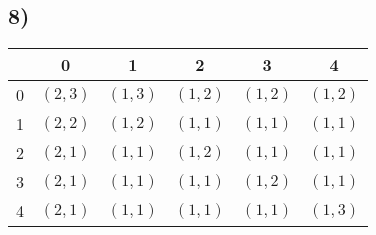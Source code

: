 \documentclass{report}
\begin{document}
\subsection*{8)}
\begin{center}
    \begin{tabularx}{200pt}{|X|c|c|c|c|c|}
        \hline
         & 0 & 1 & 2 & 3 & 4 \\\hline
         0 & $(2,3)$ & $(1,3)$ & $(1,2)$ & $(1,2)$ & $(1,2)$\\\hline
         1 & $(2,2)$ & $(1,2)$ & $(1,1)$ & $(1,1)$ & $(1,1)$\\\hline
         2 & $(2,1)$ & $(1,1)$ & $(1,2)$ & $(1,1)$ & $(1,1)$\\\hline
         3 & $(2,1)$ & $(1,1)$ & $(1,1)$ & $(1,2)$ & $(1,1)$\\\hline
         4 & $(2,1)$ & $(1,1)$ & $(1,1)$ & $(1,1)$ & $(1,3)$\\\hline
    \end{tabularx}
\end{center}
\end{document}
